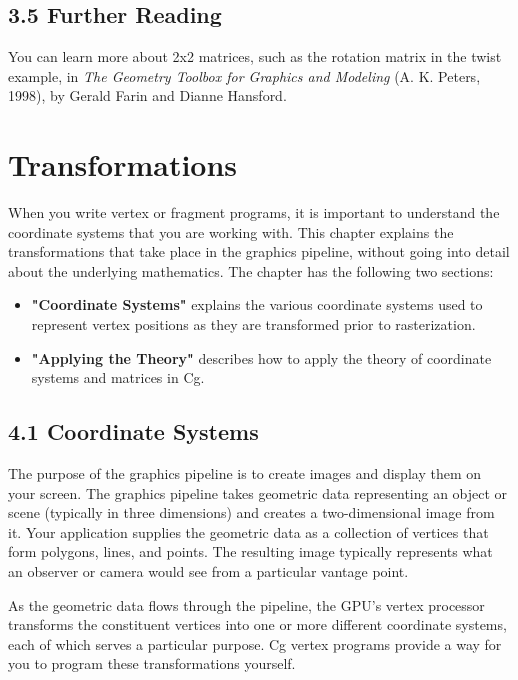 \documentclass{book}
\begin{document}
\section{3.5 Further Reading}

You can learn more about 2x2 matrices, such as the rotation matrix in the twist example, in \textit{The Geometry Toolbox for Graphics and Modeling} (A. K. Peters, 1998), by Gerald Farin and Dianne Hansford.

\chapter{Transformations}

When you write vertex or fragment programs, it is important to understand the coordinate systems that you are working with. This chapter explains the transformations that take place in the graphics pipeline, without going into detail about the underlying mathematics. The chapter has the following two sections:

\begin{itemize}
\item \textbf{"Coordinate Systems"} explains the various coordinate systems used to represent vertex positions as they are transformed prior to rasterization.
\item \textbf{"Applying the Theory"} describes how to apply the theory of coordinate systems and matrices in Cg.
\end{itemize}

\section{4.1 Coordinate Systems}

The purpose of the graphics pipeline is to create images and display them on your screen. The graphics pipeline takes geometric data representing an object or scene (typically in three dimensions) and creates a two-dimensional image from it. Your application supplies the geometric data as a collection of vertices that form polygons, lines, and points. The resulting image typically represents what an observer or camera would see from a particular vantage point.

As the geometric data flows through the pipeline, the GPU's vertex processor transforms the constituent vertices into one or more different coordinate systems, each of which serves a particular purpose. Cg vertex programs provide a way for you to program these transformations yourself.
\end{document}
